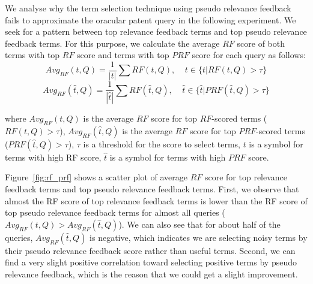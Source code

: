 We analyse why the term selection technique using pseudo relevance feedback fails to approximate the oracular patent query in the following experiment.  
We seek for a pattern between top relevance feedback terms and top pseudo relevance feedback terms. For this purpose, we calculate the average $\mathit{RF}$ score of both terms with top  $\mathit{RF}$ score and terms with top $\mathit{PRF}$ score for each query as follows:
\begin{equation}
Avg_{RF}(t, Q) = \frac{1}{|t|}\sum {RF}(t, Q), \;\;\;\; t\in \{t | RF(t, Q)>\tau\}
\end{equation}
\begin{equation}
Avg_{RF}(\hat{t}, Q) = \frac{1}{|\hat{t}|}\sum {RF}(\hat{t}, Q), \;\;\;\; \hat{t}\in \{\hat{t} | PRF(\hat{t}, Q)>\tau\} 
\end{equation}

where $Avg_{RF}(t, Q)$ is the average  $\mathit{RF}$ score for top  $\mathit{RF}$-scored terms ($RF(t, Q)>\tau$), $Avg_{RF}(\hat{t}, Q)$ is the average  $\mathit{RF}$ score for top  $\mathit{PRF}$-scored terms ($PRF(\hat{t}, Q)>\tau$), $\tau$ is a threshold for the score to select terms, $t$ is a symbol for terms with high RF score, $\hat{t}$ is a symbol for terms with high $\mathit{PRF}$ score.

Figure~\ref{fig:rf_prf} shows a scatter plot of average $\mathit{RF}$ score for top relevance feedback terms and top pseudo relevance feedback terms. First, we observe that almost the RF score of top relevance feedback terms is lower than the RF score of top pseudo relevance feedback terms for almost all queries ($ Avg_{RF}(t, Q) > Avg_{RF}(\hat{t}, Q)$). We can also see that for about half of the queries, $Avg_{RF}(\hat{t}, Q)$ is negative, which indicates we are selecting noisy terms by their pseudo relevance feedback score rather than useful terms. Second, we can find a very slight positive correlation toward selecting positive terms by pseudo relevance feedback, which is the reason that we could get a slight improvement.  

